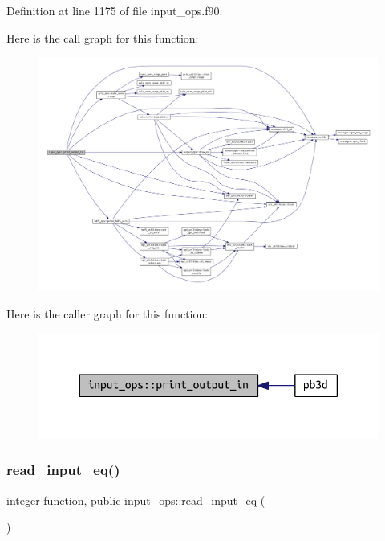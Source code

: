 Definition at line 1175 of file input\+\_\+ops.\+f90.

Here is the call graph for this function\+:\nopagebreak
\begin{figure}[H]
\begin{center}
\leavevmode
\includegraphics[width=350pt]{namespaceinput__ops_a6a1237ee3005ebd6f4978e7092ab2dc5_cgraph}
\end{center}
\end{figure}
Here is the caller graph for this function\+:\nopagebreak
\begin{figure}[H]
\begin{center}
\leavevmode
\includegraphics[width=330pt]{namespaceinput__ops_a6a1237ee3005ebd6f4978e7092ab2dc5_icgraph}
\end{center}
\end{figure}
\mbox{\label{namespaceinput__ops_a577c897cc266961eb40bb5ef747fa077}} 
\subsubsection{\texorpdfstring{read\+\_\+input\+\_\+eq()}{read\_input\_eq()}}
{\footnotesize\ttfamily integer function, public input\+\_\+ops\+::read\+\_\+input\+\_\+eq (\begin{DoxyParamCaption}{ }\end{DoxyParamCaption})}




